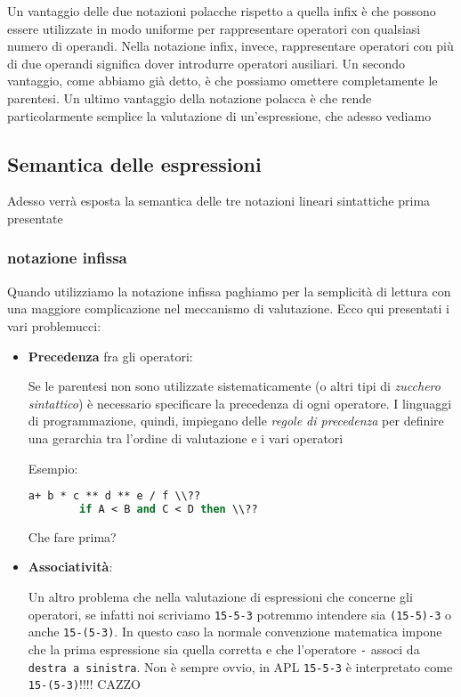 Un vantaggio delle due notazioni polacche rispetto a quella infix è che possono essere utilizzate in modo uniforme per rappresentare operatori con qualsiasi numero di operandi. Nella notazione infix, invece, rappresentare operatori con più di due operandi significa dover introdurre operatori ausiliari. Un secondo vantaggio, come abbiamo già detto, è che possiamo omettere completamente le parentesi. Un ultimo vantaggio della notazione polacca è che rende particolarmente semplice la valutazione di un'espressione, che adesso vediamo

\subsection{Semantica delle espressioni}
Adesso verrà esposta la semantica delle tre notazioni lineari sintattiche prima presentate

\subsubsection{notazione infissa}
Quando utilizziamo la notazione infissa paghiamo per la semplicità di lettura con una maggiore complicazione nel meccanismo di valutazione. Ecco qui presentati i vari problemucci:

\begin{itemize}
    \item \textbf{Precedenza} fra gli operatori:
    
    Se le parentesi non sono utilizzate sistematicamente (o altri tipi di \textit{zucchero sintattico}) è necessario specificare la precedenza di ogni operatore. I linguaggi di programmazione, quindi, impiegano delle \textit{regole di precedenza} per definire una gerarchia tra l'ordine di valutazione e i vari operatori

    Esempio:
    \begin{lstlisting}[language=Pascal]
        a+ b * c ** d ** e / f \\??
        if A < B and C < D then \\?? 
    \end{lstlisting}

    Che fare prima?

    \item \textbf{Associatività}: 
    
    Un altro problema che nella valutazione di espressioni che concerne gli operatori, se infatti noi scriviamo \texttt{15-5-3} potremmo intendere sia \texttt{(15-5)-3} o anche \texttt{15-(5-3)}. In questo caso la normale convenzione matematica impone che la prima espressione sia quella corretta e che l'operatore \texttt{-} associ da \texttt{destra a sinistra}. Non è sempre ovvio, in APL \texttt{15-5-3} è interpretato come \texttt{15-(5-3)}!!!! CAZZO
\end{itemize}

